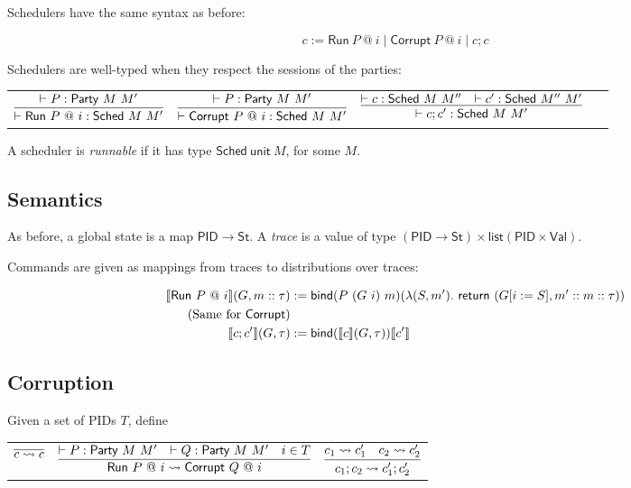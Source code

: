 \documentclass{article}
\newcommand{\Val}{\mathsf{Val}}
\newcommand{\St}{\mathsf{St}}
\newcommand{\PID}{\mathsf{PID}}
\newcommand{\List}{\mathsf{list}}
\begin{document}
Schedulers have the same syntax as before:

\[ c := \textsf{Run}\ P\ @\ i \mid \textsf{Corrupt}\ P\ @\ i \mid c; c\]

Schedulers are well-typed when they respect the sessions of the parties:

    \begin{tabular}{cccc}
        $\infer{\vdash \textsf{Run}\ P\ @\ i : \textsf{Sched}\ M\ M'}{\vdash P : \mathsf{Party}\ M\ M'}$ &
        $\infer{\vdash \textsf{Corrupt}\ P\ @\ i : \textsf{Sched}\ M\ M'}{\vdash P : \mathsf{Party}\ M\ M'}$ &
        $\infer{\vdash c; c' : \textsf{Sched}\ M\ M'}{\vdash c : \textsf{Sched}\ M\ M'' & \vdash c' : \textsf{Sched}\ M''\ M'}$ &
        \ \\
    \end{tabular}

A scheduler is \emph{runnable} if it has type $\textsf{Sched}\ \textsf{unit}\ M$, for some $M$.

\subsection{Semantics}


As before, a global state is a map $\PID \to \St$. A \emph{trace} is a value of type $(\PID \to \St) \times \List (\PID \times \Val)$.

Commands are given as mappings from traces to distributions over traces:

\begin{align*}
    \llbracket \textsf{Run}\ P\ @\ i \rrbracket (G, m :: \tau) &:= \mathsf{bind} (P\ (G\ i)\ m) (\lambda (S, m').\ \mathsf{return}\ (G[i := S], m' :: m :: \tau)) \\
    \text{(Same for \textsf{Corrupt})} \\
    \llbracket c; c' \rrbracket (G, \tau) &:= \mathsf{bind} (\llbracket c \rrbracket (G, \tau)) \llbracket c' \rrbracket
\end{align*}

\subsection{Corruption}

Given a set of PIDs $T$, define

\begin{tabular}{ccc}
    $\infer{c \rightsquigarrow c}{}$ &
    $\infer{\textsf{Run}\ P\ @\ i \rightsquigarrow \textsf{Corrupt}\ Q\ @\ i}{\vdash P : \textsf{Party}\ M\ M' & \vdash Q : \textsf{Party}\ M\ M' & i \in T}$ &
    $\infer{c_1; c_2 \rightsquigarrow c'_1; c'_2}{c_1 \rightsquigarrow c'_1 & c_2 \rightsquigarrow c'_2}$
\end{tabular}
\end{document}
